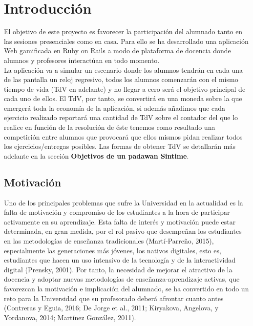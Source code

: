 \setcounter{chapter}{1}
\setcounter{section}{0}
\chapter{Introducción}

El objetivo de este proyecto es favorecer la participación del alumnado tanto en las sesiones presenciales como en casa. Para ello se ha desarrollado una aplicación Web gamificada en Ruby on Rails a modo de plataforma de docencia donde alumnos y profesores interactúan en todo momento.\\

La aplicación va a simular un escenario donde los alumnos tendrán en cada una de las pantalla un reloj regresivo, todos los alumnos comenzarán con el mismo tiempo de vida (TdV en adelante) y no llegar a cero será el objetivo principal de cada uno de ellos. El TdV, por tanto, se convertirá en una moneda sobre la que emergerá toda la economía de la aplicación, si además añadimos que cada ejercicio realizado reportará una cantidad de TdV sobre el contador del que lo realice en función de la resolución de éste tenemos como resultado una competición entre alumnos que provocará que ellos mismos pidan realizar todos los ejercicios/entregas posibles. Las formas de obtener TdV se detallarán más adelante en la sección \textbf{Objetivos de un padawan Sintime}.\\

\section{Motivación\cite{Motivacion1, Motivacion2, Motivacion3, Motivacion4, Motivacion5, Motivacion6, Motivacion7, Motivacion8, Motivacion9}}

Uno de los principales problemas que sufre la Universidad en la actualidad es la falta de motivación y compromiso de los estudiantes a la hora de participar activamente en su aprendizaje. Esta falta de interés y motivación puede estar determinada, en gran medida, por el rol pasivo que desempeñan los estudiantes en las metodologías de enseñanza tradicionales (Martí-Parreño, 2015), especialmente las generaciones más jóvenes, los nativos digitales, esto es, estudiantes que hacen un uso intensivo de la tecnología y de la interactividad digital (Prensky, 2001). Por tanto, la necesidad de mejorar el atractivo de la docencia y adoptar nuevas metodologías de enseñanza-aprendizaje activas, que favorezcan la motivación e implicación del alumnado, se ha convertido en todo un reto para la Universidad que su profesorado deberá afrontar cuanto antes (Contreras y Eguia, 2016; De Jorge et al., 2011; Kiryakova, Angelova, y Yordanova, 2014; Martínez González, 2011). \\

